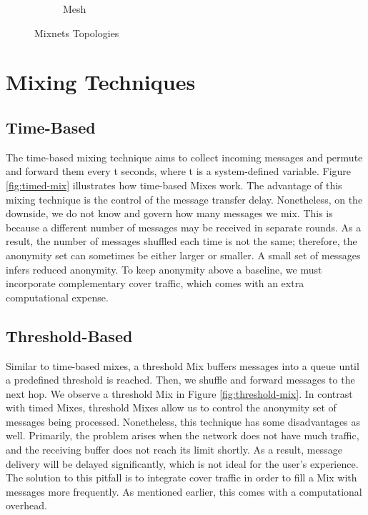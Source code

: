 \documentclass[logo,msc,cyber]{infthesis}   %
\begin{document}
\begin{figure}[h!]
\begin{subfigure}[b]{0.45\textwidth}
        \caption{Mesh}
        \label{fig:mesh}
    \end{subfigure}
       \caption{Mixnets Topologies}
       \label{fig:mixnets-topologies}
\end{figure}

\section{Mixing Techniques}

\subsection{Time-Based}
The time-based mixing technique aims to collect incoming messages and permute
and forward them every t seconds\cite{diaz2003generalising}, where t is a
system-defined variable. Figure \ref{fig:timed-mix} illustrates how time-based
Mixes work. The advantage of this mixing technique is the control of the message
transfer delay. Nonetheless, on the downside, we do not know and govern how many
messages we mix. This is because a different number of messages may be received
in separate rounds. As a result, the number of messages shuffled each time is
not the same; therefore, the anonymity set can sometimes be either larger or
smaller. A small set of messages infers reduced anonymity. To keep anonymity
above a baseline, we must incorporate complementary cover traffic, which comes
with an extra computational expense.

\subsection{Threshold-Based}
Similar to time-based mixes, a threshold Mix buffers messages into a queue until
a predefined threshold is reached. Then, we shuffle and forward messages to the
next hop\cite{diaz2003generalising}. We observe a threshold Mix in Figure
\ref{fig:threshold-mix}. In contrast with timed Mixes, threshold Mixes allow us
to control the anonymity set of messages being processed. Nonetheless, this
technique has some disadvantages as well. Primarily, the problem arises when the
network does not have much traffic, and the receiving buffer does not reach its
limit shortly. As a result, message delivery will be delayed significantly,
which is not ideal for the user's experience. The solution to this pitfall is to
integrate cover traffic in order to fill a Mix with messages more frequently. As
mentioned earlier, this comes with a computational overhead. 
\end{document}
